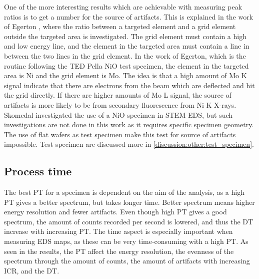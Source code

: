 One of the more interesting results which are achievable with measuring peak ratios is to get a number for the source of artifacts.
This is explained in the work of Egerton \cite{egerton_nio_characterization_1994}, where the ratio between a targeted element and a grid element outside the targeted area is investigated.
The grid element must contain a high and low energy line, and the element in the targeted area must contain a line in between the two lines in the grid element.
In the work of Egerton, which is the routine following the TED Pella NiO test specimen, the element in the targeted area is Ni and the grid element is Mo.
The idea is that a high amount of Mo K signal indicate that there are electrons from the beam which are deflected and hit the grid directly.
If there are higher amounts of Mo L signal, the source of artifacts is more likely to be from secondary fluorescence from Ni K X-rays.
Skomedal \cite{skomedal_improving_2022} investigated the use of a NiO specimen in STEM EDS, but such investigations are not done in this work as it requires specific specimen geometry.
The use of flat wafers as test specimen make this test for source of artifacts impossible.
Test specimen are discussed more in \cref{discussion:other:test_specimen}.









\subsection{Process time}
\label{discussion:process_time}

The best PT for a specimen is dependent on the aim of the analysis, as a high PT gives a better spectrum, but takes longer time.
Better spectrum means higher energy resolution and fewer artifacts.
Even though high PT gives a good spectrum, the amount of counts recorded per second is lowered, and thus the DT increase with increasing PT.
The time aspect is especially important when measuring EDS maps, as these can be very time-consuming with a high PT.
As seen in the results, the PT affect the energy resolution, the evenness of the spectrum through the amount of counts, the amount of artifacts with increasing ICR, and the DT.


